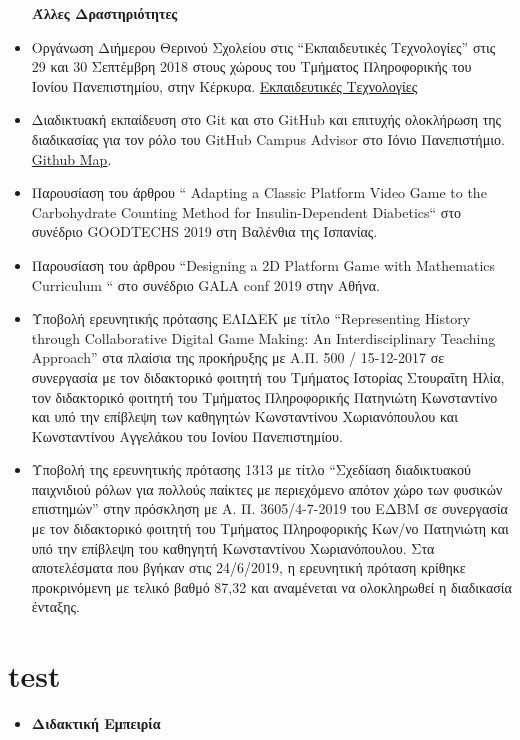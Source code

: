 \documentclass[%
    11pt,
  oneside
  ]{memoir}
\let\oldsection\section
\renewcommand{\section}[1]{%
  \oldsection{#1}
  \leavevmode
  \par
  \vspace{\dimexpr-\baselineskip-\parskip}
}
\begin{document}
\begin{itemize}
  \textbf{Άλλες Δραστηριότητες}
\item
  Οργάνωση Διήμερου Θερινού Σχολείου στις ``Εκπαιδευτικές Τεχνολογίες''
  στις 29 και 30 Σεπτέμβρη 2018 στους χώρους του Τμήματος Πληροφορικής
  του Ιονίου Πανεπιστημίου, στην Κέρκυρα.
  \href{https://bgarnb.github.io/Educational-Technologies/}{Εκπαιδευτικές
  Τεχνολογίες}
\item
  Διαδικτυακή εκπαίδευση στο Git και στο GitHub και επιτυχής ολοκλήρωση
  της διαδικασίας για τον ρόλο του GitHub Campus Advisor στο Ιόνιο
  Πανεπιστήμιο.
  \href{https://education.github.com/teachers/advisors}{Github Map}.
\item
  Παρουσίαση του άρθρου `` Adapting a Classic Platform Video Game to the
  Carbohydrate Counting Method for Insulin-Dependent Diabetics`` στο
  συνέδριο GOODTECHS 2019 στη Βαλένθια της Ισπανίας.
\item
  Παρουσίαση του άρθρου ``Designing a 2D Platform Game with Mathematics
  Curriculum `` στο συνέδριο GALA conf 2019 στην Αθήνα.
\item
  Υποβολή ερευνητικής πρότασης ΕΛΙΔΕΚ με τίτλο ``Representing History
  through Collaborative Digital Game Making: An Interdisciplinary
  Teaching Approach'' στα πλαίσια της προκήρυξης με Α.Π. 500 /
  15-12-2017 σε συνεργασία με τον διδακτορικό φοιτητή του Tμήματος
  Ιστορίας Στουραΐτη Ηλία, τον διδακτορικό φοιτητή του Tμήματος
  Πληροφορικής Πατηνιώτη Κωνσταντίνο και υπό την επίβλεψη των καθηγητών
  Κωνσταντίνου Χωριανόπουλου και Κωνσταντίνου Αγγελάκου του Ιονίου
  Πανεπιστημίου.
\item
  Υποβολή της ερευνητικής πρότασης 1313 με τίτλο ``Σχεδίαση διαδικτυακού
  παιχνιδιού ρόλων για πολλούς παίκτες με περιεχόμενο απότον χώρο των
  φυσικών επιστημών'' στην πρόσκληση με Α. Π. 3605/4-7-2019 του ΕΔΒΜ σε
  συνεργασία με τον διδακτορικό φοιτητή του Τμήματος Πληροφορικής Κων/νο
  Πατηνιώτη και υπό την επίβλεψη του καθηγητή Κωνσταντίνου
  Χωριανόπουλου. Στα αποτελέσματα που βγήκαν στις 24/6/2019, η
  ερευνητική πρόταση κρίθηκε προκρινόμενη με τελικό βαθμό 87,32 και
  αναμένεται να ολοκληρωθεί η διαδικασία ένταξης.
\end{itemize}

\hypertarget{test}{%
\section{test}\label{test}}

\begin{itemize}
\tightlist
\item
  \textbf{Διδακτική Εμπειρία}
\end{itemize}
\end{document}
